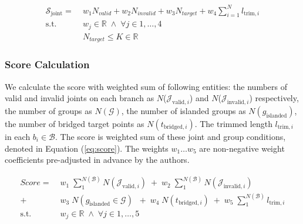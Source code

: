 \begin{equation}
 \begin{aligned}
 \mathcal{S}_{\text{joint}} =  &\; w_1 N_{valid} + w_2 N_{invalid} + w_3 N_{target} + w_4 \sum_{i=1}^{N} l_{\text{trim}, i}
 \\
   \textrm{s.t.}
   & \; w_j  \in \mathbb{R} \; \wedge \;   \forall j \in 1, \dotsc , 4 \\
   & \; N_{target} \leq K \in \mathbb{R}
 \end{aligned}
 \label{eq:joint}
\end{equation}


\subsubsection{Score Calculation}
We calculate the score with weighted sum of following entities: the numbers of valid and invalid joints on each branch as $N$($\mathcal{J}_{\text{valid},i}$) and  $N$($\mathcal{J}_{\text{invalid},i}$) respectively, the number of groups as $N(\mathcal{G} )$, the number of islanded groups as $N(g_{\text{islanded}})$, the number of bridged target points as $N(t_{\text{bridged}, i})$.
The trimmed length $l_{\text{trim}, i}$ in each $b_i \in \mathcal{B}$.
The score is weighted sum of these joint and group conditions, denoted in Equation (\ref{eq:score}).
The weights $w_1 \dotso  w_5$ are non-negative weight coefficients pre-adjusted in advance by the authors.


\begin{equation}
 \begin{aligned}
 Score =  &\; w_1\;  \sum_{1}^{N(\mathcal{B})} N(\mathcal{J}_{\text{valid},i})\; +  \;w_2\; \sum_{1}^{N(\mathcal{B})} N(\mathcal{J}_{\text{invalid},i})\\
		+ &\; w_3\;  N(g_{\text{islanded}} \in \mathcal{G} )\;				 	 \;+  \;w_4\;  N(t_{\text{bridged}, i}) \; +  \;w_5\; \sum_{1}^{N(\mathcal{B})} l_{\text{trim}, i}
 \\
   \textrm{s.t.} & \; w_j  \in \mathbb{R} \; \wedge \;   \forall j \in 1, \dotsc , 5
 \end{aligned}
 \label{eq:score}
\end{equation}

